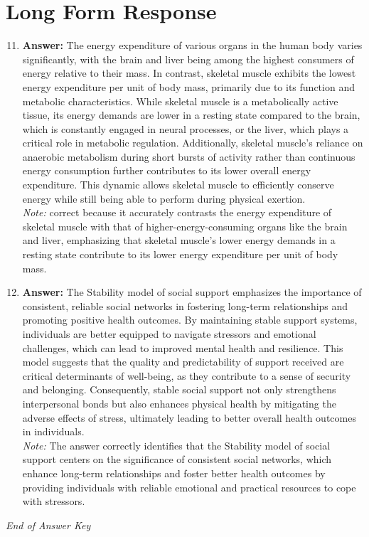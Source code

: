 \documentclass[12pt]{article}
\begin{document}
\section*{Long Form Response}
\begin{enumerate}[label=\arabic*.]
\setcounter{enumi}{10}
\item \textbf{Answer:} The energy expenditure of various organs in the human body varies significantly, with the brain and liver being among the highest consumers of energy relative to their mass. In contrast, skeletal muscle exhibits the lowest energy expenditure per unit of body mass, primarily due to its function and metabolic characteristics. While skeletal muscle is a metabolically active tissue, its energy demands are lower in a resting state compared to the brain, which is constantly engaged in neural processes, or the liver, which plays a critical role in metabolic regulation. Additionally, skeletal muscle's reliance on anaerobic metabolism during short bursts of activity rather than continuous energy consumption further contributes to its lower overall energy expenditure. This dynamic allows skeletal muscle to efficiently conserve energy while still being able to perform during physical exertion.
\\ \textit{Note:} correct because it accurately contrasts the energy expenditure of skeletal muscle with that of higher-energy-consuming organs like the brain and liver, emphasizing that skeletal muscle's lower energy demands in a resting state contribute to its lower energy expenditure per unit of body mass.
\item \textbf{Answer:} The Stability model of social support emphasizes the importance of consistent, reliable social networks in fostering long-term relationships and promoting positive health outcomes. By maintaining stable support systems, individuals are better equipped to navigate stressors and emotional challenges, which can lead to improved mental health and resilience. This model suggests that the quality and predictability of support received are critical determinants of well-being, as they contribute to a sense of security and belonging. Consequently, stable social support not only strengthens interpersonal bonds but also enhances physical health by mitigating the adverse effects of stress, ultimately leading to better overall health outcomes in individuals.
\\ \textit{Note:} The answer correctly identifies that the Stability model of social support centers on the significance of consistent social networks, which enhance long-term relationships and foster better health outcomes by providing individuals with reliable emotional and practical resources to cope with stressors.
\end{enumerate}

\vfill
\noindent\textit{End of Answer Key}
\end{document}
